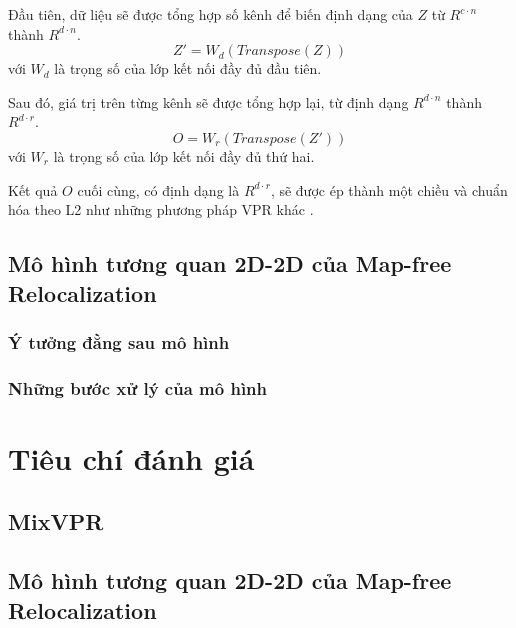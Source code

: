 Đầu tiên, dữ liệu sẽ được tổng hợp số kênh để biến định dạng của $Z$ từ $R^{c \cdot n}$ thành $R^{d \cdot n}$.
$$
Z' = W_d(Transpose(Z))
$$
với $W_d$ là trọng số của lớp kết nối đầy đủ đầu tiên.

Sau đó, giá trị trên từng kênh sẽ được tổng hợp lại, từ định dạng $R^{d \cdot n}$ thành $R^{d \cdot r}$.
$$
O = W_r(Transpose(Z'))
$$
với $W_r$ là trọng số của lớp kết nối đầy đủ thứ hai.

Kết quả $O$ cuối cùng, có định dạng là $R^{d \cdot r}$, sẽ được ép thành một chiều và chuẩn hóa theo L2 như những phương pháp VPR khác \cite{arandjelović2016netvlad,berton2022rethinking}.

\subsection{Mô hình tương quan 2D-2D của Map-free Relocalization \cite{arnold2022mapfree}}
\subsubsection*{Ý tưởng đằng sau mô hình}
\subsubsection*{Những bước xử lý của mô hình}

\section{Tiêu chí đánh giá}
\subsection{MixVPR}
\subsection{Mô hình tương quan 2D-2D của Map-free Relocalization}


